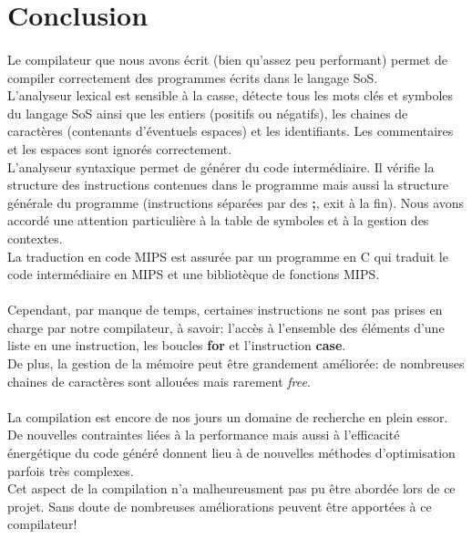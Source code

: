 \section{Conclusion}

\paragraph{}
Le compilateur que nous avons écrit (bien qu'assez peu performant) permet de compiler correctement des programmes écrits dans le langage SoS.\\
L'analyseur lexical est sensible à la casse, détecte tous les mots clés et symboles du langage SoS ainsi que les entiers (positifs ou négatifs), les chaines de caractères (contenants d'éventuels espaces) et les identifiants. Les commentaires et les espaces sont ignorés correctement.\\
L'analyseur syntaxique permet de générer du code intermédiaire. Il vérifie la structure des instructions contenues dans le programme mais aussi la structure générale du programme (instructions séparées par des \textbf{;}, exit à la fin). Nous avons accordé une attention particulière à la table de symboles et à la gestion des contextes.\\
La traduction en code MIPS est assurée par un programme en C qui traduit le code intermédiaire en MIPS et une bibliotèque de fonctions MIPS.

\paragraph{}
Cependant, par manque de temps, certaines instructions ne sont pas prises en charge par notre compilateur, à savoir: l'accès à l'ensemble des éléments d'une liste en une instruction, les boucles \textbf{for} et l'instruction \textbf{case}.\\
De plus, la gestion de la mémoire peut être grandement améliorée: de nombreuses chaines de caractères sont allouées mais rarement \textit{free}.

\paragraph{}
La compilation est encore de nos jours un domaine de recherche en plein essor. De nouvelles contraintes liées à la performance mais aussi à l'efficacité énergétique du code généré donnent lieu à de nouvelles méthodes d'optimisation parfois très complexes.\\
Cet aspect de la compilation n'a malheureusment pas pu être abordée lors de ce projet. Sans doute de nombreuses améliorations peuvent être apportées à ce compilateur!
